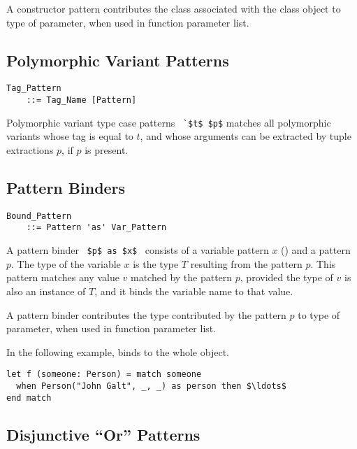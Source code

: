 A constructor pattern contributes the class associated with the class object to type of parameter, when used in function parameter list. 





\subsection{Polymorphic Variant Patterns}
\label{sec:polymorphic-variant-patterns}

\grammar\begin{lstlisting}
Tag_Pattern 
    ::= Tag_Name [Pattern]
\end{lstlisting}

Polymorphic variant type case patterns ~\lstinline!`$t$ $p$! matches all polymorphic variants whose tag is equal to $t$, and whose arguments can be extracted by tuple extractions $p$, if $p$ is present. 





\subsection{Pattern Binders}
\label{sec:pattern-binders}

\grammar\begin{lstlisting}
Bound_Pattern 
    ::= Pattern 'as' Var_Pattern
\end{lstlisting}

A pattern binder ~\lstinline!$p$ as $x$!~ consists of a variable pattern $x$ () and a pattern $p$. The type of the variable $x$ is the type $T$ resulting from the pattern $p$. This pattern matches any value $v$ matched by the pattern $p$, provided the type of $v$ is also an instance of $T$, and it binds the variable name to that value. 

A pattern binder contributes the type contributed by the pattern $p$ to type of parameter, when used in function parameter list. 

\example In the following example,  binds to the whole  object. 
\begin{lstlisting}
let f (someone: Person) = match someone
  when Person("John Galt", _, _) as person then $\ldots$
end match
\end{lstlisting}





\subsection[Disjunctive “Or” Patterns]{Disjunctive ``Or'' Patterns}
\label{sec:disjunctive-patterns}


